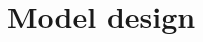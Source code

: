 \documentclass[preprint2]{aastex63}
\newcommand\aastex{AAS\TeX}
\newcommand\latex{La\TeX}
\begin{document}
%

\section{Model design} \label{sec:model}
\end{document}

